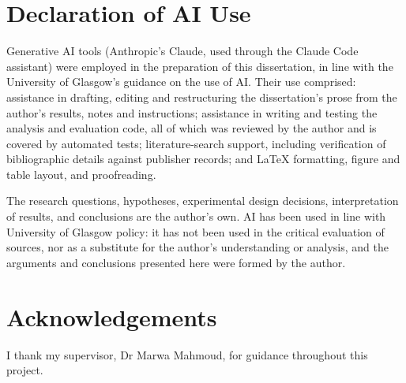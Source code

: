 \documentclass{mproj}
\begin{document}
\educationalconsent

\section*{Declaration of AI Use}
Generative AI tools (Anthropic's Claude, used through the Claude Code assistant) were employed in the
preparation of this dissertation, in line with the University of Glasgow's guidance on the use of AI. Their
use comprised: assistance in drafting, editing and restructuring the dissertation's prose from the author's
results, notes and instructions; assistance in writing and testing the analysis and evaluation code, all of
which was reviewed by the author and is covered by automated tests; literature-search support, including
verification of bibliographic details against publisher records; and \LaTeX{} formatting, figure and table
layout, and proofreading.

The research questions, hypotheses, experimental design decisions, interpretation of results, and
conclusions are the author's own. AI has been used in line with University of Glasgow policy: it has not
been used in the critical evaluation of sources, nor as a substitute for the author's understanding or
analysis, and the arguments and conclusions presented here were formed by the author.

\newpage
\section*{Acknowledgements}
I thank my supervisor, Dr Marwa Mahmoud, for guidance throughout this project.

\tableofcontents
\listoffigures
\listoftables
\end{document}

